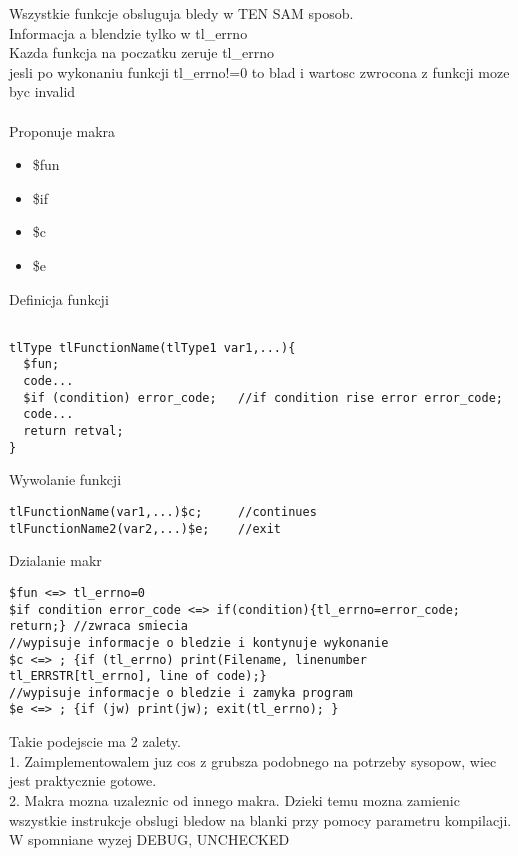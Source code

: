 \documentclass[10pt,a4paper]{article}
\begin{document}
	
	Wszystkie funkcje obsluguja bledy w TEN SAM sposob.\\
	Informacja a blendzie tylko w tl_errno\\
	Kazda funkcja na poczatku zeruje tl_errno\\
	jesli po wykonaniu funkcji tl_errno!=0 to blad i wartosc  zwrocona z funkcji moze byc invalid\\
	\\
	Proponuje makra\\
\begin{itemize}
	\item \$fun
	\item \$if
	\item \$c
	\item \$e
\end{itemize}

Definicja funkcji\\
\begin{verbatim}
	
tlType tlFunctionName(tlType1 var1,...){
  $fun;
  code...
  $if (condition) error_code;	//if condition rise error error_code;
  code...
  return retval;
}
\end{verbatim}
	
Wywolanie funkcji\\
\begin{verbatim}
tlFunctionName(var1,...)$c;		//continues 
tlFunctionName2(var2,...)$e;	//exit
\end{verbatim}

 Dzialanie makr\\

\begin{verbatim}
$fun <=> tl_errno=0
$if condition error_code <=> if(condition){tl_errno=error_code; return;} //zwraca smiecia
//wypisuje informacje o bledzie i kontynuje wykonanie
$c <=> ; {if (tl_errno) print(Filename, linenumber tl_ERRSTR[tl_errno], line of code);}
//wypisuje informacje o bledzie i zamyka program
$e <=> ; {if (jw) print(jw); exit(tl_errno); }
\end{verbatim}
	
Takie podejscie ma 2 zalety.\\
1. Zaimplementowalem juz cos z grubsza podobnego na potrzeby sysopow, wiec jest praktycznie gotowe.\\
2. Makra mozna uzaleznic od  innego makra. Dzieki temu mozna zamienic wszystkie instrukcje obslugi bledow na blanki przy pomocy parametru kompilacji. W spomniane wyzej DEBUG, UNCHECKED
\end{document}
